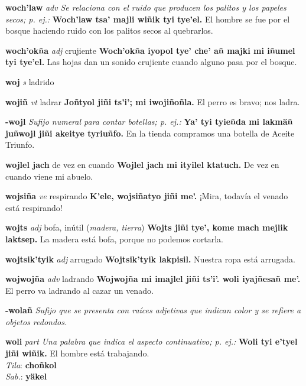 \documentclass[10pt]{scrbook}
\newcommand{\entry}[1]{\textbf{#1}}
\newcommand{\nontranslationdef}[1]{\textit{#1}}
\newcommand{\partofspeech}[1]{\textit{#1}}
\newcommand{\spanishtranslation}[1]{#1}
\newcommand{\clarification}[1]{(\textit{#1})}
\newcommand{\cholexample}[1]{\textbf{#1}}
\newcommand{\exampletranslation}[1]{#1}
\newcommand{\dialectvariant}[1]{\\\textit{#1}:}
\newcommand{\dialectword}[1]{\textbf{#1}}
\begin{document}
\begin{multicols}{2}
\entry{woch'law}
\partofspeech{adv}
\nontranslationdef{Se relaciona con el ruido que producen los palitos y los papeles secos; p. ej.:}
\cholexample{Woch'law tsa' majli wiñik tyi tye'el.}
\exampletranslation{El hombre se fue por el bosque haciendo ruido con los palitos secos al quebrarlos.}

\entry{woch'okña}
\partofspeech{adj}
\spanishtranslation{crujiente}
\cholexample{Woch'okña iyopol tye' che' añ majki mi iñumel tyi tye'el.}
\exampletranslation{Las hojas dan un sonido crujiente cuando alguno pasa por el bosque.}

\entry{woj}
\partofspeech{s}
\spanishtranslation{ladrido}

\entry{wojiñ}
\partofspeech{vt}
\spanishtranslation{ladrar}
\cholexample{Joñtyol jiñi ts'i'; mi iwojiñoñla.}
\exampletranslation{El perro es bravo; nos ladra.}

\entry{-wojl}
\nontranslationdef{Sufijo numeral para contar botellas; p. ej.:}
\cholexample{Ya' tyi tyieñda mi lakmäñ juñwojl jiñi akeitye tyriuñfo.}
\exampletranslation{En la tienda compramos una botella de Aceite Triunfo.}

\entry{wojlel jach}
\spanishtranslation{de vez en cuando}
\cholexample{Wojlel jach mi ityilel ktatuch.}
\exampletranslation{De vez en cuando viene mi abuelo.}

\entry{wojsiña}
\partofspeech{ve}
\spanishtranslation{respirando}
\cholexample{K'ele, wojsiñatyo jiñi me'.}
\exampletranslation{¡Mira, todavía el venado está respirando!}

\entry{wojts}
\partofspeech{adj}
\spanishtranslation{bofa, inútil}
\clarification{madera, tierra}
\cholexample{Wojts jiñi tye', kome mach mejlik laktsep.}
\exampletranslation{La madera está bofa, porque no podemos cortarla.}

\entry{wojtsik'tyik}
\partofspeech{adj}
\spanishtranslation{arrugado}
\cholexample{Wojtsik'tyik lakpisil.}
\exampletranslation{Nuestra ropa está arrugada.}

\entry{wojwojña}
\partofspeech{adv}
\spanishtranslation{ladrando}
\cholexample{Wojwojña mi imajlel jiñi ts'i'. woli iyajñesañ me'.}
\exampletranslation{El perro va ladrando al cazar un venado.}

\entry{-wolañ}
\nontranslationdef{Sufijo que se presenta con raíces adjetivas que indican color y se refiere a objetos redondos.}

\entry{woli}
\partofspeech{part}
\nontranslationdef{Una palabra que indica el aspecto continuativo; p. ej.:}
\cholexample{Woli tyi e'tyel jiñi wiñik.}
\exampletranslation{El hombre está trabajando.}
\dialectvariant{Tila}
\dialectword{choñkol}
\dialectvariant{Sab.}
\dialectword{yäkel}


\end{multicols}
\end{document}

